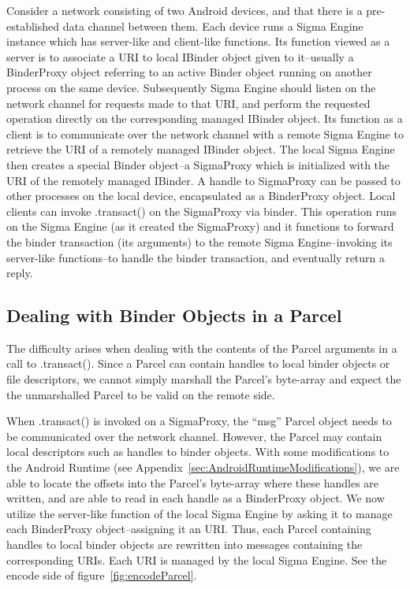 \documentclass[prodmode]{acmlarge}
\begin{document}

Consider a network consisting of two Android devices, and that there is a pre-established data channel between them. Each device runs a Sigma Engine instance which has server-like and client-like functions. Its function viewed as a server is to associate a URI to local IBinder object given to it--usually a BinderProxy object referring to an active Binder object running on another process on the same device. Subsequently Sigma Engine should listen on the network channel for requests made to that URI, and perform the requested operation directly on the corresponding managed IBinder object. Its function as a client is to communicate over the network channel with a remote Sigma Engine to retrieve the URI of a remotely managed IBinder object. The local Sigma Engine then creates a special Binder object--a SigmaProxy which is initialized with the URI of the remotely managed IBinder. A handle to SigmaProxy can be passed to other processes on the local device, encapsulated as a BinderProxy object. Local clients can invoke .transact() on the SigmaProxy via binder. This operation runs on the Sigma Engine (as it created the SigmaProxy) and it functions to forward the binder transaction (its arguments) to the remote Sigma Engine--invoking its server-like functions--to handle the binder transaction, and eventually return a reply.

\subsection{Dealing with Binder Objects in a Parcel}
The difficulty arises when dealing with the contents of the Parcel arguments in a call to .transact(). Since a Parcel can contain handles to local binder objects or file descriptors, we cannot simply marshall the Parcel's byte-array and expect the the unmarshalled Parcel to be valid on the remote side.

When .transact() is invoked on a SigmaProxy, the ``msg'' Parcel object needs to be communicated over the network channel. However, the Parcel may contain local descriptors such as handles to binder objects. With some modifications to the Android Runtime (see Appendix~\ref{sec:AndroidRuntimeModifications}), we are able to locate the offsets into the Parcel's byte-array where these handles are written, and are able to read in each handle as a BinderProxy object. We now utilize the server-like function of the local Sigma Engine by asking it to manage each BinderProxy object--assigning it an URI. Thus, each Parcel containing handles to local binder objects are rewritten into messages containing the corresponding URIs. Each URI is managed by the local Sigma Engine. See the encode side of figure~\ref{fig:encodeParcel}.
\end{document}
